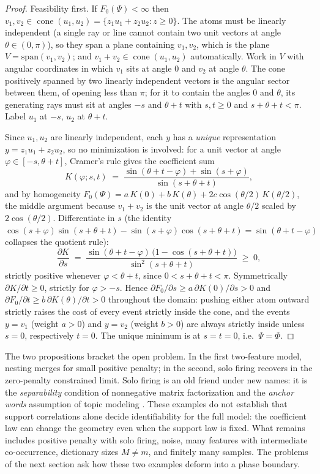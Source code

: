 \documentclass[11pt]{amsart}
\theoremstyle{plain}
\theoremstyle{definition}
\DeclareMathOperator{\cone}{cone}
\begin{document}
\begin{proof}
Feasibility first. If $F_0(\Psi)<\infty$ then $v_1,v_2\in\cone(u_1,u_2)=\{z_1u_1+z_2u_2:z\ge0\}$. The atoms must be linearly independent (a single ray or line cannot contain two unit vectors at angle $\theta\in(0,\pi)$), so they span a plane containing $v_1,v_2$, which is the plane $V=\mathrm{span}(v_1,v_2)$; and $v_1+v_2\in\cone(u_1,u_2)$ automatically. Work in $V$ with angular coordinates in which $v_1$ sits at angle $0$ and $v_2$ at angle $\theta$. The cone positively spanned by two linearly independent vectors is the angular sector between them, of opening less than $\pi$; for it to contain the angles $0$ and $\theta$, its generating rays must sit at angles $-s$ and $\theta+t$ with $s,t\ge0$ and $s+\theta+t<\pi$. Label $u_1$ at $-s$, $u_2$ at $\theta+t$.

Since $u_1,u_2$ are linearly independent, each $y$ has a \emph{unique} representation $y=z_1u_1+z_2u_2$, so no minimization is involved: for a unit vector at angle $\varphi\in[-s,\theta+t]$, Cramer's rule gives the coefficient sum
\[
  K(\varphi;s,t)\;=\;\frac{\sin(\theta+t-\varphi)+\sin(s+\varphi)}{\sin(s+\theta+t)} ,
\]
and by homogeneity $F_0(\Psi)=a\,K(0)+b\,K(\theta)+2c\cos(\theta/2)\,K(\theta/2)$, the middle argument because $v_1+v_2$ is the unit vector at angle $\theta/2$ scaled by $2\cos(\theta/2)$. Differentiate in $s$ (the identity $\cos(s+\varphi)\sin(s+\theta+t)-\sin(s+\varphi)\cos(s+\theta+t)=\sin(\theta+t-\varphi)$ collapses the quotient rule):
\[
  \frac{\partial K}{\partial s}\;=\;\frac{\sin(\theta+t-\varphi)\,\bigl(1-\cos(s+\theta+t)\bigr)}{\sin^2(s+\theta+t)}\;\ge\;0,
\]
strictly positive whenever $\varphi<\theta+t$, since $0<s+\theta+t<\pi$. Symmetrically $\partial K/\partial t\ge0$, strictly for $\varphi>-s$. Hence $\partial F_0/\partial s\ge a\,\partial K(0)/\partial s>0$ and $\partial F_0/\partial t\ge b\,\partial K(\theta)/\partial t>0$ throughout the domain: pushing either atom outward strictly raises the cost of every event strictly inside the cone, and the events $y=v_1$ (weight $a>0$) and $y=v_2$ (weight $b>0$) are always strictly inside unless $s=0$, respectively $t=0$. The unique minimum is at $s=t=0$, i.e.\ $\Psi=\Phi$.
\end{proof}

The two propositions bracket the open problem. In the first two-feature model, nesting merges for small positive penalty; in the second, solo firing recovers in the zero-penalty constrained limit. Solo firing is an old friend under new names: it is the \emph{separability} condition of nonnegative matrix factorization \cite{donoho2003} and the \emph{anchor words} assumption of topic modeling \cite{arora2012}. These examples do not establish that support correlations alone decide identifiability for the full model: the coefficient law can change the geometry even when the support law is fixed. What remains includes positive penalty with solo firing, noise, many features with intermediate co-occurrence, dictionary sizes $M\neq m$, and finitely many samples. The problems of the next section ask how these two examples deform into a phase boundary.
\end{document}
